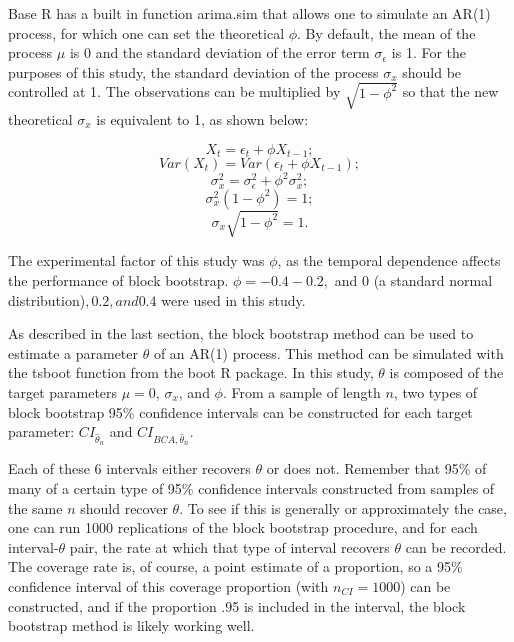 \documentclass[12pt, letterpaper, titlepage]{article}
\begin{document}



Base R has a built in function arima.sim that allows one to simulate an AR(1) process, for which one can set the theoretical $\phi$. 
By default, the mean of the process $\mu$ is 0 and the standard deviation of the error term $\sigma_{\epsilon}$ is 1. 
For the purposes of this study, the standard deviation of the process $\sigma_{x}$ should be controlled at 1. 
The observations can be multiplied by $\sqrt{1 - \phi^2}$ so that the new theoretical $\sigma_{x}$ is equivalent to 1, as shown below:

\[X_{t} = \epsilon_{t} + \phi X_{t-1};\]
\[Var(X_{t}) = Var(\epsilon_{t} + \phi X_{t-1});\]
\[\sigma^2_{x} = \sigma^2_{\epsilon} + \phi^2 \sigma^2_{x};\]
\[\sigma^2_{x}(1 - \phi^2) = 1;\]
\[\sigma_{x}\sqrt{1 - \phi^2} = 1.\]

The experimental factor of this study was $\phi$, as the temporal dependence affects the performance of block bootstrap. 
$\phi = -0.4 -0.2,$ and $0$ (a standard normal distribution)$, 0.2, and 0.4$ were used in this study. 


As described in the last section, the block bootstrap method can be used to estimate a parameter $\theta$ of an AR(1) process. 
This method can be simulated with the tsboot function from the boot R package. In this study, $\theta$ is composed of the target 
parameters $\mu = 0$, $\sigma_{x}$, and $\phi$. From a sample of length $n$, two types of block bootstrap 95\% confidence intervals 
can be constructed for each target parameter: $CI_{\hat{\theta}_{n}}$ and $CI_{BCA, \hat{\theta}_{n}}$.


Each of these 6 intervals either recovers $\theta$ or does not. Remember that 95\% of many of a certain type of 95\% confidence intervals 
constructed from samples of the same $n$ should recover $\theta$. To see if this is generally or approximately the case, one can run 
1000 replications of the block bootstrap procedure, and for each interval-$\theta$ pair, the rate at which that type of interval recovers 
$\theta$ can be recorded. The coverage rate is, of course, a point estimate of a proportion, so a 95\% confidence interval of this coverage proportion 
(with $n_{CI} = 1000$) can be constructed, and if the proportion .95 is included in the interval, the block bootstrap method is likely working well.
\end{document}
